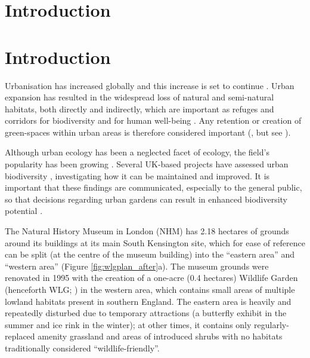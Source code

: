 \ifappendixStyle %
\section{Introduction} %
\else
\section*{Introduction}
\fi


Urbanisation has increased globally and this increase is set to continue \citep{Heilig:2012un}. Urban expansion has resulted in the widespread loss of natural and semi-natural habitats, both directly and indirectly, which are important as refuges and corridors for biodiversity \citep{Goulson:2002oe,Osborne:2008jpe} and for human well-being \citep{Fuller:2007bl,Dallimer:2012bs,Bratman:2015nature,Shanahan:2016sr}. Any retention or creation of green-spaces within urban areas is therefore considered important (\citealt{Alvey:2006uf}, but see \citealt{Dearborn:2010cb}).

Although urban ecology has been a neglected facet of ecology, the field's popularity has been growing \citep{Mcphearson:2016Bs}. Several UK-based projects have assessed urban biodiversity \citep{Gaston:2004bugs,Angold:2006ste}, investigating how it can be maintained and improved. It is important that these findings are communicated, especially to the general public, so that decisions regarding urban gardens can result in enhanced biodiversity potential \citep[e.g.][]{Thompson:2007no}.

The Natural History Museum in London (NHM) has 2.18 hectares of grounds around its buildings at its main South Kensington site, which for ease of reference can be split (at the centre of the museum building) into the ``eastern area'' and ``western area'' (Figure \ref{fig:wlgplan_after}a). The museum grounds were renovated in 1995 with the creation of a one-acre (0.4 hectares) Wildlife Garden (henceforth WLG; \citealt{Honey:1999ln}) in the western area, which contains small areas of multiple lowland habitats present in southern England. The eastern area is heavily and repeatedly disturbed due to temporary attractions (a butterfly exhibit in the summer and ice rink in the winter); at other times, it contains only regularly-replaced amenity grassland and areas of introduced shrubs with no habitats traditionally considered ``wildlife-friendly''. 


